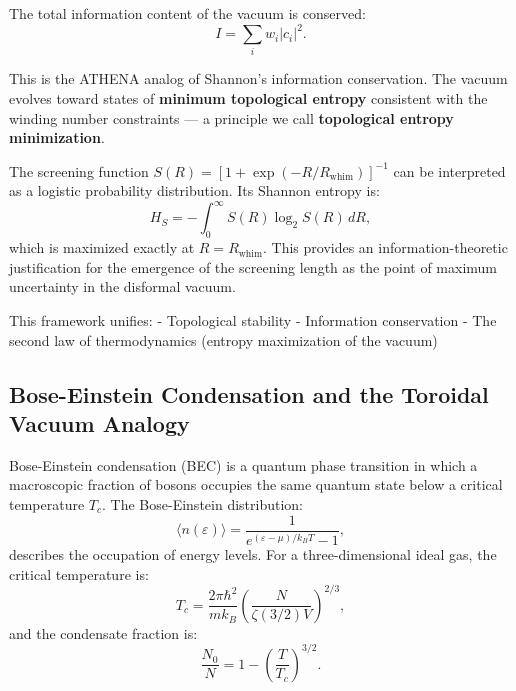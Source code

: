 \documentclass[12pt, a4paper]{article}
\begin{document}
The total information content of the vacuum is conserved:
\begin{equation}
I = \sum_i w_i |c_i|^2.
\label{eq:information_conservation}
\end{equation}

This is the ATHENA analog of Shannon's information conservation. The vacuum evolves toward states of \textbf{minimum topological entropy} consistent with the winding number constraints — a principle we call \textbf{topological entropy minimization}.

The screening function $S(R) = [1 + \exp(-R/R_{\mathrm{whim}})]^{-1}$ can be interpreted as a logistic probability distribution. Its Shannon entropy is:
\begin{equation}
H_S = -\int_0^\infty S(R) \log_2 S(R) \, dR,
\label{eq:screening_entropy}
\end{equation}
which is maximized exactly at $R = R_{\mathrm{whim}}$. This provides an information-theoretic justification for the emergence of the screening length as the point of maximum uncertainty in the disformal vacuum.

This framework unifies:
- Topological stability
- Information conservation
- The second law of thermodynamics (entropy maximization of the vacuum)

\subsection{Bose-Einstein Condensation and the Toroidal Vacuum Analogy}
\label{sec:bec}

Bose-Einstein condensation (BEC) is a quantum phase transition in which a macroscopic fraction of bosons occupies the same quantum state below a critical temperature $T_c$. The Bose-Einstein distribution:
\begin{equation}
\langle n(\varepsilon) \rangle = \frac{1}{e^{(\varepsilon - \mu)/k_B T} - 1},
\label{eq:bose_distribution}
\end{equation}
describes the occupation of energy levels. For a three-dimensional ideal gas, the critical temperature is:
\begin{equation}
T_c = \frac{2\pi\hbar^2}{m k_B} \left( \frac{N}{\zeta(3/2) V} \right)^{2/3},
\label{eq:critical_temp}
\end{equation}
and the condensate fraction is:
\begin{equation}
\frac{N_0}{N} = 1 - \left( \frac{T}{T_c} \right)^{3/2}.
\label{eq:condensate_fraction}
\end{equation}
\end{document}
